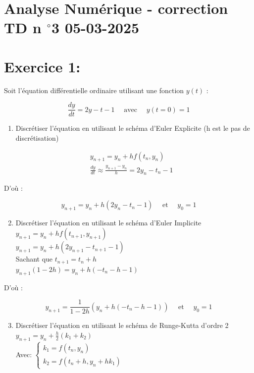\documentclass[10pt]{article}
\begin{document}
\section*{Analyse Numérique - correction TD n \({ }^{\boldsymbol{\circ}} \mathbf{3}\) 05-03-2025}
\section*{Exercice 1:}
Soit l'équation différentielle ordinaire utilisant une fonction \(y(t)\) :

\[
\frac{d y}{d t}=2 y-t-1 \quad \text { avec } \quad y(t=0)=1
\]

\begin{enumerate}
  \item Discrétiser l'équation en utilisant le schéma d'Euler Explicite (h est le pas de discrétisation)
\end{enumerate}

\[
\begin{aligned}
& y_{n+1}=y_{n}+h f\left(t_{n}, y_{n}\right) \\
& \frac{d y}{d t} \approx \frac{y_{n+1}-y_{n}}{h}=2 y_{n}-t_{n}-1
\end{aligned}
\]

D'où :

\[
y_{n+1}=y_{n}+h\left(2 y_{n}-t_{n}-1\right) \quad \text { et } \quad y_{0}=1
\]

\begin{enumerate}
  \setcounter{enumi}{1}
  \item Discrétiser l'équation en utilisant le schéma d'Euler Implicite\\
\(y_{n+1}=y_{n}+h f\left(t_{n+1}, y_{n+1}\right)\)\\
\(y_{n+1}=y_{n}+h\left(2 y_{n+1}-t_{n+1}-1\right)\)\\
Sachant que \(t_{n+1}=t_{n}+h\)\\
\(y_{n+1}(1-2 h)=y_{n}+h\left(-t_{n}-h-1\right)\)
\end{enumerate}

D'où :

\[
y_{n+1}=\frac{1}{1-2 h}\left(y_{n}+h\left(-t_{n}-h-1\right)\right) \quad \text { et } \quad y_{0}=1
\]

\begin{enumerate}
  \setcounter{enumi}{2}
  \item Discrétiser l'équation en utilisant le schéma de Runge-Kutta d'ordre 2\\
\(y_{n+1}=y_{n}+\frac{h}{2}\left(k_{1}+k_{2}\right)\)\\
Avec: \(\left\{\begin{array}{c}k_{1}=f\left(t_{n}, y_{n}\right) \\ k_{2}=f\left(t_{n}+h, y_{n}+h k_{1}\right)\end{array}\right.\)
\end{enumerate}
\end{document}
